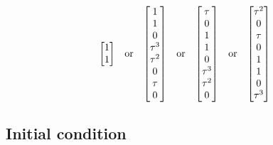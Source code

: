 \begin{align}
\begin{array}{lcccccccc}
\begin{bmatrix}
        1
        \\
        1
    \end{bmatrix}
    &
    \text{or}
    &
    \begin{bmatrix}
        1
        \\
        1
        \\
        0
        \\
        \tau^3
        \\
        \tau^2
        \\
        0
        \\
        \tau
        \\
        0
    \end{bmatrix}
    & 
    \text{or}
    &
    \begin{bmatrix}
        \tau
        \\
        0
        \\
        1
        \\
        1
        \\
        0
        \\
        \tau^3
        \\
        \tau^2
        \\
        0
    \end{bmatrix}
    &
    \text{or}
    &
    \begin{bmatrix}
        \tau^2
        \\
        0
        \\
        \tau
        \\
        0
        \\
        1
        \\
        1
        \\
        0
        \\
        \tau^3
    \end{bmatrix}
    \end{array}
\end{align}



\vspace{-0.5cm}

\subsection{Initial condition}
\vspace{-0.2cm}



